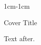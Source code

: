 \documentclass{memoir}
\begin{document}
\begin{adjustwidth*}{1cm}{-1cm}
\begin{center}\huge Cover Title\end{center}
\end{adjustwidth*}
Text after.
\end{document}
